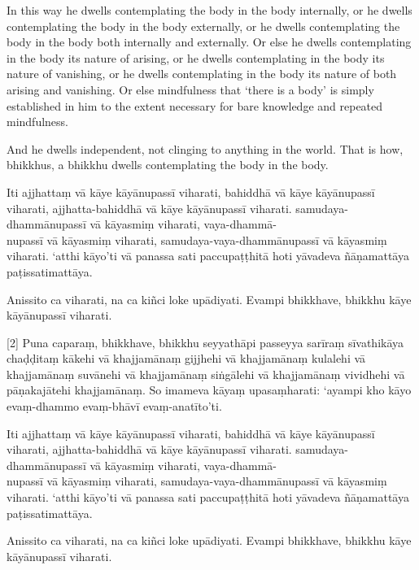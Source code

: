 In this way he dwells contemplating the body in the body internally, or he
dwells contemplating the body in the body externally, or he dwells contemplating
the body in the body both internally and externally. Or else he dwells
contemplating in the body its nature of arising, or he dwells contemplating in
the body its nature of vanishing, or he dwells contemplating in the body its
nature of both arising and vanishing. Or else mindfulness that ‘there is a body’
is simply established in him to the extent necessary for bare knowledge and
repeated mindfulness.

And he dwells independent, not clinging to anything in the world. That is how,
bhikkhus, a bhikkhu dwells contemplating the body in the body.

\paliPage

Iti ajjhattaṃ vā kāye kāyānupassī viharati, bahiddhā vā kāye kāyānupassī
viharati, ajjhatta-bahiddhā vā kāye kāyānupassī viharati. samudaya-dhammānupassī
vā kāyasmiṃ viharati, vaya-dhammā-\\
nupassī vā kāyasmiṃ viharati, samudaya-vaya-dhammānupassī vā kāyasmiṃ viharati.
‘atthi kāyo’ti vā panassa sati paccupaṭṭhitā hoti yāvadeva ñāṇamattāya
paṭissatimattāya.

Anissito ca viharati, na ca kiñci loke upādiyati. Evampi bhikkhave, bhikkhu kāye
kāyānupassī viharati.

[2] Puna caparaṃ, bhikkhave, bhikkhu seyyathāpi passeyya sarīraṃ sīvathikāya chaḍḍitaṃ
kākehi vā khajjamānaṃ gijjhehi vā khajjamānaṃ kulalehi vā khajjamānaṃ suvānehi
vā khajjamānaṃ siṅgālehi vā khajjamānaṃ vividhehi vā pāṇakajātehi khajjamānaṃ.
So imameva kāyaṃ upasaṃharati: ‘ayampi kho kāyo evaṃ-dhammo evaṃ-bhāvī
evaṃ-anatīto’ti.

Iti ajjhattaṃ vā kāye kāyānupassī viharati, bahiddhā vā kāye kāyānupassī
viharati, ajjhatta-bahiddhā vā kāye kāyānupassī viharati. samudaya-dhammānupassī
vā kāyasmiṃ viharati, vaya-dhammā-\\
nupassī vā kāyasmiṃ viharati, samudaya-vaya-dhammānupassī vā kāyasmiṃ viharati.
‘atthi kāyo’ti vā panassa sati paccupaṭṭhitā hoti yāvadeva ñāṇamattāya
paṭissatimattāya.

Anissito ca viharati, na ca kiñci loke upādiyati. Evampi bhikkhave, bhikkhu kāye
kāyānupassī viharati.

\englishPage

